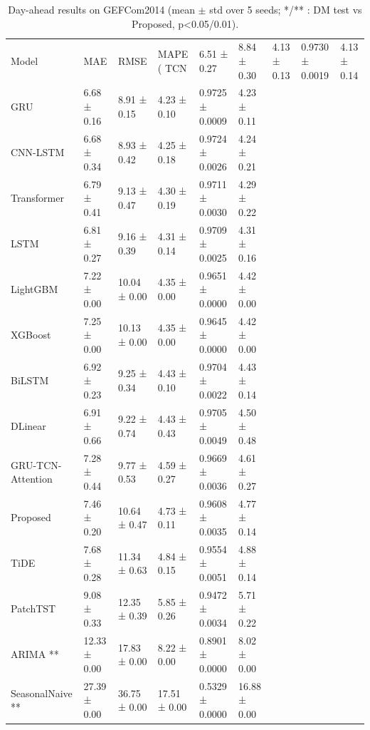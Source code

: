 \begin{table}
\caption{Day-ahead results on GEFCom2014 (mean $\pm$ std over 5 seeds; */** : DM test vs Proposed, p<0.05/0.01).}
\label{tab:results_gefcom2014}
\begin{tabular}{llllll}
\toprule
Model & MAE & RMSE & MAPE (%
\midrule
TCN & 6.51 ± 0.27 & 8.84 ± 0.30 & 4.13 ± 0.13 & 0.9730 ± 0.0019 & 4.13 ± 0.14 \\
GRU & 6.68 ± 0.16 & 8.91 ± 0.15 & 4.23 ± 0.10 & 0.9725 ± 0.0009 & 4.23 ± 0.11 \\
CNN-LSTM & 6.68 ± 0.34 & 8.93 ± 0.42 & 4.25 ± 0.18 & 0.9724 ± 0.0026 & 4.24 ± 0.21 \\
Transformer & 6.79 ± 0.41 & 9.13 ± 0.47 & 4.30 ± 0.19 & 0.9711 ± 0.0030 & 4.29 ± 0.22 \\
LSTM & 6.81 ± 0.27 & 9.16 ± 0.39 & 4.31 ± 0.14 & 0.9709 ± 0.0025 & 4.31 ± 0.16 \\
LightGBM & 7.22 ± 0.00 & 10.04 ± 0.00 & 4.35 ± 0.00 & 0.9651 ± 0.0000 & 4.42 ± 0.00 \\
XGBoost & 7.25 ± 0.00 & 10.13 ± 0.00 & 4.35 ± 0.00 & 0.9645 ± 0.0000 & 4.42 ± 0.00 \\
BiLSTM & 6.92 ± 0.23 & 9.25 ± 0.34 & 4.43 ± 0.10 & 0.9704 ± 0.0022 & 4.43 ± 0.14 \\
DLinear & 6.91 ± 0.66 & 9.22 ± 0.74 & 4.43 ± 0.43 & 0.9705 ± 0.0049 & 4.50 ± 0.48 \\
GRU-TCN-Attention & 7.28 ± 0.44 & 9.77 ± 0.53 & 4.59 ± 0.27 & 0.9669 ± 0.0036 & 4.61 ± 0.27 \\
Proposed & 7.46 ± 0.20 & 10.64 ± 0.47 & 4.73 ± 0.11 & 0.9608 ± 0.0035 & 4.77 ± 0.14 \\
TiDE & 7.68 ± 0.28 & 11.34 ± 0.63 & 4.84 ± 0.15 & 0.9554 ± 0.0051 & 4.88 ± 0.14 \\
PatchTST & 9.08 ± 0.33 & 12.35 ± 0.39 & 5.85 ± 0.26 & 0.9472 ± 0.0034 & 5.71 ± 0.22 \\
ARIMA ** & 12.33 ± 0.00 & 17.83 ± 0.00 & 8.22 ± 0.00 & 0.8901 ± 0.0000 & 8.02 ± 0.00 \\
SeasonalNaive ** & 27.39 ± 0.00 & 36.75 ± 0.00 & 17.51 ± 0.00 & 0.5329 ± 0.0000 & 16.88 ± 0.00 \\
\bottomrule
\end{tabular}
\end{table}
